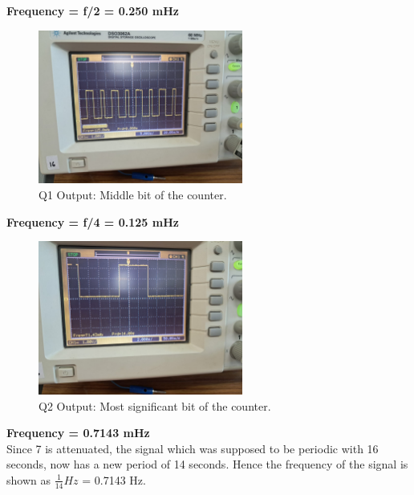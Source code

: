 \documentclass[a4paper,12pt]{article}
\begin{document}
\textbf{Frequency = f/2 = 0.250 mHz}
\begin{figure}[H]
    \centering
    \includegraphics[width=0.6\textwidth]{figs/q1.jpeg} %
    \caption{Q1 Output: Middle bit of the counter.}
    \label{fig:q1}
\end{figure}
\textbf{Frequency = f/4 = 0.125 mHz}
\begin{figure}[H]
    \centering
    \includegraphics[width=0.6\textwidth]{figs/q2.jpeg} %
    \caption{Q2 Output: Most significant bit of the counter.}
    \label{fig:q2}
\end{figure}
\textbf{Frequency = 0.7143 mHz}\\
Since 7 is attenuated, the signal which was supposed to be periodic with 16 seconds, now has a new period of 14 seconds. Hence the frequency of the signal is shown as $\frac{1}{14} Hz$ = 0.7143 Hz.
\end{document}

